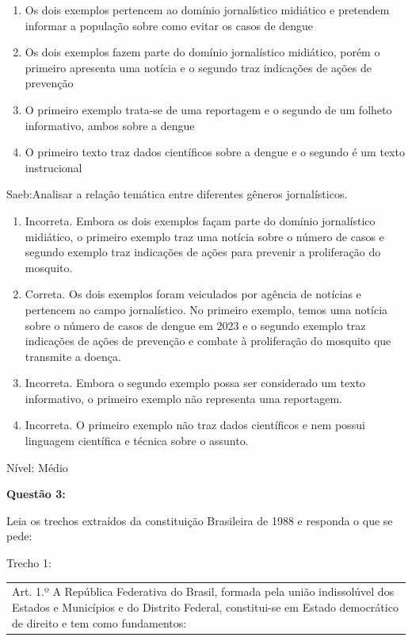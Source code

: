 {\begin{enumerate}
\def\labelenumi{\alph{enumi})}
\item
  Os dois exemplos pertencem ao domínio jornalístico midiático e
  pretendem informar a população sobre como evitar os casos de dengue
\item
  Os dois exemplos fazem parte do domínio jornalístico midiático, porém
  o primeiro apresenta uma notícia e o segundo traz indicações de ações
  de prevenção
\item
  O primeiro exemplo trata-se de uma reportagem e o segundo de um
  folheto informativo, ambos sobre a dengue
\item
  O primeiro texto traz dados científicos sobre a dengue e o segundo é
  um texto instrucional
\end{enumerate}

Saeb:Analisar a relação temática entre diferentes gêneros jornalísticos.

\begin{enumerate}
\def\labelenumi{\arabic{enumi}.}
\item
  Incorreta. Embora os dois exemplos façam parte do domínio jornalístico
  midiático, o primeiro exemplo traz uma notícia sobre o número de casos
  e segundo exemplo traz indicações de ações para prevenir a
  proliferação do mosquito.
\item
  Correta. Os dois exemplos foram veiculados por agência de notícias e
  pertencem ao campo jornalístico. No primeiro exemplo, temos uma
  notícia sobre o número de casos de dengue em 2023 e o segundo exemplo
  traz indicações de ações de prevenção e combate à proliferação do
  mosquito que transmite a doença.
\item
  Incorreta. Embora o segundo exemplo possa ser considerado um texto
  informativo, o primeiro exemplo não representa uma reportagem.
\item
  Incorreta. O primeiro exemplo não traz dados científicos e nem possui
  linguagem científica e técnica sobre o assunto.
\end{enumerate}

Nível: Médio

\textbf{Questão 3:}

Leia os trechos extraídos da constituição Brasileira de 1988 e responda
o que se pede:

Trecho 1:

\begin{longtable}[]{@{}
  >{\raggedright\arraybackslash}p{}@{}}
\toprule
\endhead
Art. 1.º A República Federativa do Brasil, formada pela união
indissolúvel dos Estados e Municípios e do Distrito Federal,
constitui-se em Estado democrático de direito e tem como fundamentos:


\end{longtable}}
